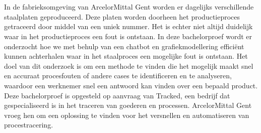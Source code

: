 
%
%
%
%
%

%



\chapter*{}
In de fabrieksomgeving van ArcelorMittal Gent worden er dagelijks verschillende staalplaten geproduceerd.
Deze platen worden doorheen het productieproces getraceerd door middel van een uniek nummer.
Het is echter niet altijd duidelijk waar in het productieproces een fout is ontstaan.
In deze bachelorproef wordt er onderzocht hoe we met behulp van een chatbot en grafiekmodellering efficiënt kunnen achterhalen waar in het staalproces een mogelijke fout is ontstaan.
Het doel van dit onderzoek is om een methode te vinden die het mogelijk maakt snel en accuraat procesfouten of andere cases te identificeren en te analyseren, waardoor een werknemer snel een antwoord kan vinden over een bepaald product.
Deze bachelorproef is opgesteld op aanvraag van Tracked, een bedrijf dat gespecialiseerd is in het traceren van goederen en processen.
ArcelorMittal Gent vroeg hen om een oplossing te vinden voor het versnellen en automatiseren van procestracering. 

